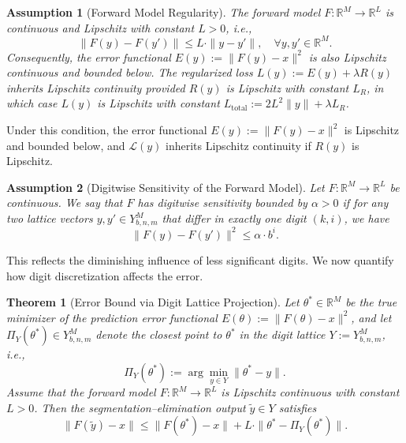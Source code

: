 \documentclass[aps,twocolumn,superscriptaddress,nofootinbib]{revtex4}
\newtheorem{theorem}{Theorem}
\newtheorem{assumption}{Assumption}
\begin{document}
\begin{assumption}[Forward Model Regularity]
\label{assumption:forward_lipschitz}
The forward model \( F : \mathbb{R}^M \to \mathbb{R}^L \) is continuous and Lipschitz with constant \( L > 0 \), i.e.,
\[
\|F(y) - F(y')\| \leq L \cdot \|y - y'\|, \quad \forall y, y' \in \mathbb{R}^M.
\]
Consequently, the error functional \( E(y) := \|F(y) - x\|^2 \) is also Lipschitz continuous and bounded below. The regularized loss \( L(y) := E(y) + \lambda R(y) \) inherits Lipschitz continuity provided \( R(y) \) is Lipschitz with constant \( L_R \), in which case \( L(y) \) is Lipschitz with constant \( L_{\mathrm{total}} := 2L^2 \|y\| + \lambda L_R \).
\end{assumption}

Under this condition, the error functional $E(y) := \|F(y) - x\|^2$ is Lipschitz and bounded below, and $\mathcal{L}(y)$ inherits Lipschitz continuity if $R(y)$ is Lipschitz.


\begin{assumption}[Digitwise Sensitivity of the Forward Model]
Let $F : \mathbb{R}^M \to \mathbb{R}^L$ be continuous. We say that $F$ has digitwise sensitivity bounded by $\alpha > 0$ if for any two lattice vectors $y, y' \in Y^M_{b,n,m}$ that differ in exactly one digit $(k,i)$, we have
\begin{equation}
    \|F(y) - F(y')\|^2 \leq \alpha \cdot b^i. \label{eq:digitwise-sensitivity}
\end{equation}
\end{assumption}

This reflects the diminishing influence of less significant digits. We now quantify how digit discretization affects the error.

\begin{theorem}[Error Bound via Digit Lattice Projection]
\label{thm:error_bound_projection}
Let \( \theta^* \in \mathbb{R}^M \) be the true minimizer of the prediction error functional \( E(\theta) := \|F(\theta) - x\|^2 \), and let \( \Pi_Y(\theta^*) \in Y_{b,n,m}^M \) denote the closest point to \( \theta^* \) in the digit lattice \( Y := Y_{b,n,m}^M \), i.e.,
\[
\Pi_Y(\theta^*) := \arg\min_{y \in Y} \|\theta^* - y\|.
\]
Assume that the forward model \( F: \mathbb{R}^M \to \mathbb{R}^L \) is Lipschitz continuous with constant \( L > 0 \). Then the segmentation--elimination output \( \tilde{y} \in Y \) satisfies
\[
\|F(\tilde{y}) - x\| \leq \|F(\theta^*) - x\| + L \cdot \|\theta^* - \Pi_Y(\theta^*)\|.
\]
\end{theorem}
\end{document}
